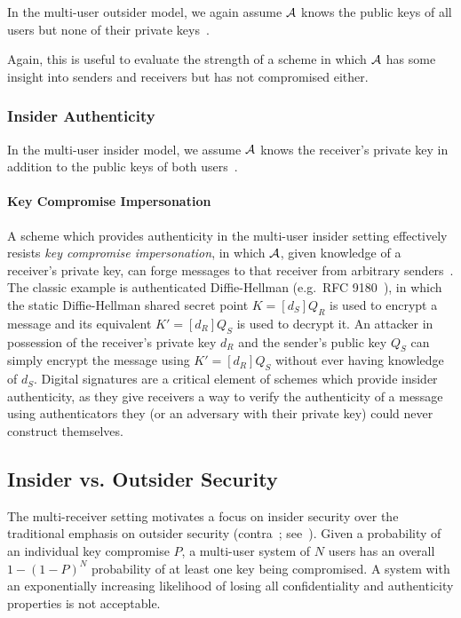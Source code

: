 In the multi-user outsider model, we again assume $\mathcal{A}$ knows the public keys of all users but none of their
private keys~\cite[p. 47]{baek2010}\@.

Again, this is useful to evaluate the strength of a scheme in which $\mathcal{A}$ has some insight into senders and
receivers but has not compromised either.

\subsubsection{Insider Authenticity}\label{subsubsec:sec-auth-insider}

In the multi-user insider model, we assume $\mathcal{A}$ knows the receiver's private key in addition to the public keys
of both users~\cite[p. 48]{baek2010}\@.

\paragraph{Key Compromise Impersonation}

A scheme which provides authenticity in the multi-user insider setting effectively resists
\emph{key compromise impersonation}, in which $\mathcal{A}$, given knowledge of a receiver's private key, can
forge messages to that receiver from arbitrary senders~\cite{strangio2006}\@.
The classic example is authenticated Diffie-Hellman (e.g.\ RFC 9180~\cite{rfc9180, alwen2021}), in which the static
Diffie-Hellman shared secret point $K=[d_S]Q_R$ is used to encrypt a message and its equivalent $K'=[d_R]Q_S$ is used
to decrypt it.
An attacker in possession of the receiver's private key $d_R$ and the sender's public key $Q_S$ can simply encrypt the
message using $K'=[d_R]Q_S$ without ever having knowledge of $d_S$.
Digital signatures are a critical element of schemes which provide insider authenticity, as they give receivers a way to
verify the authenticity of a message using authenticators they \@(or an adversary with their private key) could never
construct themselves.

\subsection{Insider vs. Outsider Security}\label{subsec:security-insider-vs-outsider}

The multi-receiver setting motivates a focus on insider security over the traditional emphasis on outsider security
(contra~\cite[p. 26]{an2010}\cite[p. 46]{baek2010}; see~\cite{badertscher2018}).
Given a probability of an individual key compromise $P$, a multi-user system of $N$ users has an overall $1-(1-P)^N$
probability of at least one key being compromised.
A system with an exponentially increasing likelihood of losing all confidentiality and authenticity properties is not
acceptable.

